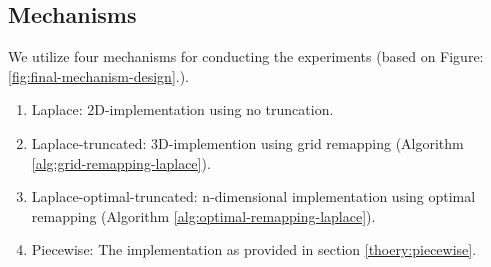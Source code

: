 \subsection{Mechanisms}
We utilize four mechanisms for conducting the experiments (based on Figure: \ref{fig:final-mechanism-design}.).
\begin{enumerate}
  \item Laplace: 2D-implementation using no truncation.
  \item Laplace-truncated: 3D-implemention using grid remapping (Algorithm \ref{alg:grid-remapping-laplace}).
  \item Laplace-optimal-truncated: n-dimensional implementation using optimal remapping (Algorithm \ref{alg:optimal-remapping-laplace}).
  \item Piecewise: The implementation as provided in section \ref{thoery:piecewise}.
\end{enumerate}

